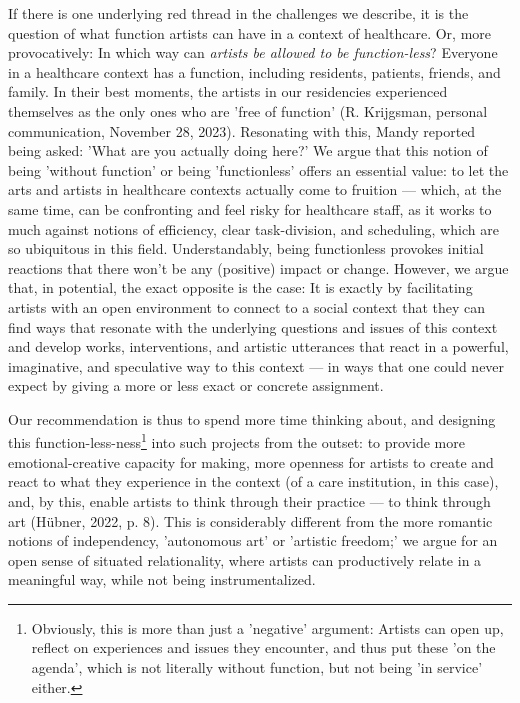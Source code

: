 \documentclass[authordate, empirical]{jote-new-article}
\begin{document}
	If there is one underlying red thread in the challenges we describe, it is the question of what function artists can have in a context of healthcare. Or, more provocatively: In which way can \emph{artists be allowed to be function-less}? Everyone in a healthcare context has a function, including residents, patients, friends, and family. In their best moments, the artists in our residencies experienced themselves as the only ones who are 'free of function' (R. Krijgsman, personal communication, November 28, 2023). Resonating with this, Mandy reported being asked: 'What are you actually doing here?' We argue that this notion of being 'without function' or being 'functionless' offers an essential value: to let the arts and artists in healthcare contexts actually come to fruition --- which, at the same time, can be confronting and feel risky for healthcare staff, as it works to much against notions of efficiency, clear task-division, and scheduling, which are so ubiquitous in this field. Understandably, being functionless provokes initial reactions that there won't be any (positive) impact or change. However, we argue that, in potential, the exact opposite is the case: It is exactly by facilitating artists with an open environment to connect to a social context that they can find ways that resonate with the underlying questions and issues of this context and develop works, interventions, and artistic utterances that react in a powerful, imaginative, and speculative way to this context --- in ways that one could never expect by giving a more or less exact or concrete assignment.







	Our recommendation is thus to spend more time thinking about, and designing this function-less-ness\footnote{ Obviously, this is more than just a 'negative' argument: Artists can open up, reflect on experiences and issues they encounter, and thus put these 'on the agenda', which is not literally without function, but not being 'in service' either.} into such projects from the outset: to provide more emotional-creative capacity for making, more openness for artists to create and react to what they experience in the context (of a care institution, in this case), and, by this, enable artists to think through their practice --- to think through art (Hübner, 2022, p. 8). This is considerably different from the more romantic notions of independency, 'autonomous art' or 'artistic freedom;' we argue for an open sense of situated relationality, where artists can productively relate in a meaningful way, while not being instrumentalized.
\end{document}
